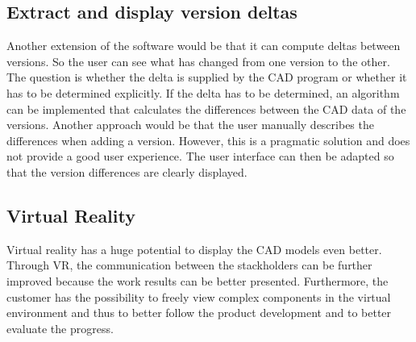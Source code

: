 \subsection*{Extract and display version deltas}

Another extension of the software would be that it can compute deltas between versions. So the user can see what has changed from one version to the other. The question is whether the delta is supplied by the CAD program or whether it has to be determined explicitly. If the delta has to be determined, an algorithm can be implemented that calculates the differences between the CAD data of the versions. Another approach would be that the user manually describes the differences when adding a version. However, this is a pragmatic solution and does not provide a good user experience. The user interface can then be adapted so that the version differences are clearly displayed.

\subsection*{Virtual Reality}

Virtual reality has a huge potential to display the CAD models even better. Through VR, the communication between the stackholders can be further improved because the work results can be better presented. Furthermore, the customer has the possibility to freely view complex components in the virtual environment and thus to better follow the product development and to better evaluate the progress.
